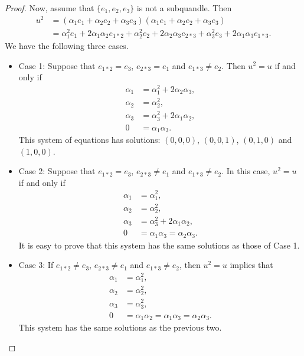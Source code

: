 \documentclass[12 pt]{amsart}
\theoremstyle{definition}
\theoremstyle{remark}
\numberwithin{equation}{section}
\begin{document}
\begin{proof}
       Now, assume that $\{e_1, e_2, e_3\}$ is not a subquandle. Then
       \begin{align*}
           u^2&=(\alpha_{1}e_1+ \alpha_{2}e_2+ \alpha_{3}e_3)(\alpha_{1}e_1+ \alpha_{2}e_2+ \alpha_{3}e_3)\\
           &=\alpha^{2}_{1}e_1+2\alpha_{1}\alpha_{2}e_{1\ast 2}+\alpha^{2}_{2}e_2+2\alpha_{2}\alpha_{3}e_{2\ast3}+\alpha^{2}_{3}e_3+2\alpha_{1}\alpha_{3}e_{1\ast3}.
       \end{align*} 
       We have the following three cases.
        \begin{itemize}
            \item Case 1: Suppose that $e_{1\ast2}=e_3$, $e_{2\ast3}=e_1$ and $e_{1\ast3}\neq e_2$. Then $u^2=u$ if and only if 
            \begin{align*}
               \alpha_{1}&= \alpha^{2}_{1}+2\alpha_{2}\alpha_{3},\\
               \alpha_{2}&=\alpha^{2}_{2},\\
               \alpha_{3}&=\alpha^{2}_{3}+2\alpha_{1}\alpha_{2},\\
               0&=\alpha_{1}\alpha_{3}.
            \end{align*}
             This system of equations has solutions: $(0,0,0)$, $(0,0,1)$, $(0,1,0)$ and $(1,0,0)$. 
           \item Case 2: Suppose that $e_{1\ast2}=e_3$, $e_{2\ast3}\neq e_1$ and $e_{1\ast3}\neq e_2$. In this case, $u^2=u$ if and only if 
            \begin{align*}
               \alpha_{1}&= \alpha^{2}_{1},\\
               \alpha_{2}&=\alpha^{2}_{2},\\
               \alpha_{3}&=\alpha^{2}_{3}+2\alpha_{1}\alpha_{2},\\
        0&=\alpha_{1}\alpha_{3}=\alpha_{2}\alpha_{3}.
            \end{align*}
           It is easy to prove that this system has the same solutions as those of Case 1.
            \item Case  3: If $e_{1\ast2}\neq e_3$, $e_{2\ast3}\neq e_1$ and $e_{1\ast3}\neq e_2$, then $u^2=u$ implies that 
            \begin{align*}
               \alpha_{1}&= \alpha^{2}_{1},\\
               \alpha_{2}&=\alpha^{2}_{2},\\
               \alpha_{3}&=\alpha^{2}_{3},\\
            0&=\alpha_{1}\alpha_{2}=\alpha_{1}\alpha_{3}=\alpha_{2}\alpha_{3}.
            \end{align*}
This system has the same solutions as the previous two.
        \end{itemize}
\end{proof}
\end{document}
